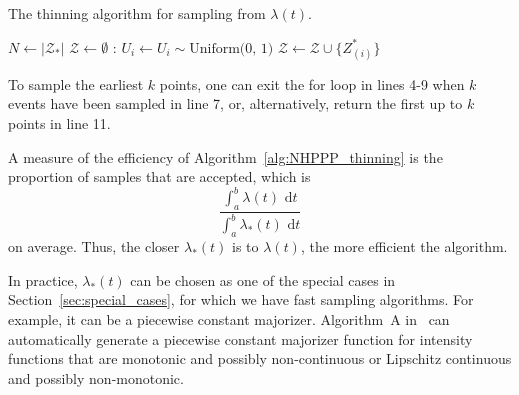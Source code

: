 \documentclass[10pt,letterpaper]{article}
\begin{document}
\begin{algorithm}[h!]
\caption{The thinning algorithm for sampling from $\lambda(t)$.}\label{alg:NHPPP_thinning}
\begin{algorithmic}[1]
\Require{
\begin{itemize}
\item[] {$ $}
\item[] { $\lambda_*(t) \ge \lambda(t) \ \forall \ t \in (a, ])$} \Comment{majorizing intensity function}
\item[] {$\mathcal{Z}_* = \{ Z^*_i \ | \ Z^*_i \textrm{ are samples from } \lambda_*(t) \}$} \Comment{$\mathcal{Z}_*$ is an ordered set} 
\end{itemize}}
\State $N \gets |\mathcal{Z}_*|$
\State $\mathcal{Z} \gets \emptyset$ 
    :
        \State $U_i \gets  U_i \sim \textrm{Uniform(0, 1)}$ 
            \State $\mathcal{Z} \gets \mathcal{Z} \cup \{ Z^*_{(i)} \} $ 
        \EndIf
    \EndFor
\EndIf
\State
{} 
\end{algorithmic}
\end{algorithm}


To sample the earliest $k$ points, one can exit the for loop in lines 4-9 when $k$ events have been sampled in line 7, or, alternatively, return the first up to $k$ points in line 11.

A measure of the efficiency of Algorithm~\ref{alg:NHPPP_thinning} is the proportion of samples that are accepted, which is
\begin{equation}\label{eq:thinning-efficiency}
\frac{\int_a^b{\lambda(t) \textrm{ d}t}}{\int_a^b{\lambda_*(t) \textrm{ d}t}}
\end{equation}
on average. Thus, the closer $\lambda_*(t)$ is to $\lambda(t)$, the more efficient the algorithm.

In practice, $\lambda_*(t)$ can be chosen as one of the special cases in Section~\ref{sec:special_cases}, for which we have fast sampling algorithms. For example, it can be a piecewise constant majorizer. Algorithm~A %
in~ can automatically generate a piecewise constant majorizer function for intensity functions that are monotonic and possibly non-continuous or Lipschitz continuous and possibly non-monotonic.
\end{document}
